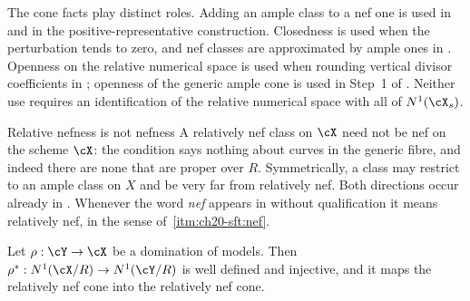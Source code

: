 \begin{remark}
\label{rem:ch20-cone-facts}
The cone facts play distinct roles.  Adding an ample class to a nef one
is used in  and in
the positive-representative construction.  Closedness is used when the
perturbation tends to zero, and nef classes are approximated by ample
ones in .  Openness on the relative numerical
space is used when rounding vertical divisor coefficients in
; openness of the
generic ample cone is used in Step~1 of
.  Neither use requires an
identification of the relative numerical space with all of
$N^1(\cX_s)$.
\end{remark}

\begin{warning}{Relative nefness is not nefness}
A relatively nef class on $\cX$ need not be nef on the scheme $\cX$: the
condition says nothing about curves in the generic fibre, and indeed there
are none that are proper over $R$.  Symmetrically, a class may restrict to
an ample class on $X$ and be very far from relatively nef.  Both
directions occur already in .  Whenever the
word \emph{nef} appears in 
without qualification it means relatively nef, in the sense of
\,\cref{itm:ch20-sft:nef}.
\end{warning}

\begin{lemma}
\label{lem:ch20-pullback-injective}
Let $\rho:\cY\to\cX$ be a domination of models.  Then
$\rho^*:N^1(\cX/R)\to N^1(\cY/R)$ is well defined and injective, and it
maps the relatively nef cone into the relatively nef cone.
\end{lemma}

